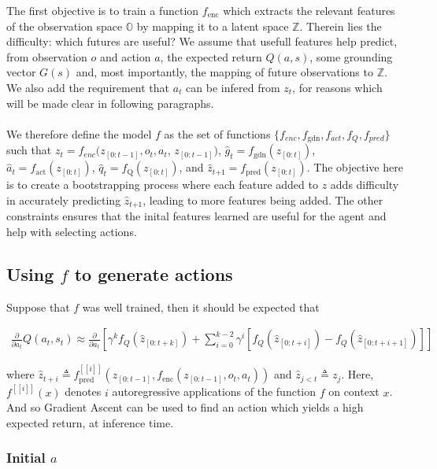 \documentclass[]{article}
\begin{document}
The first objective is to train a function $f_{\text{enc}}$ which extracts the relevant features of the observation space $\mathbb{O}$ by mapping it to a latent space $\mathbb{Z}$. Therein lies the difficulty: which futures are useful?
We assume that usefull features help predict, from observation $o$ and action $a$, the expected return $Q(a, s)$, some grounding vector $G(s)$ and, most importantly, the mapping of future observations to $\mathbb{Z}$. We also add the requirement that $a_t$ can be infered from $z_t$, for reasons which will be made clear in following paragraphs.
\\ \\ 
We therefore define the model $f$ as the set of functions $\{f_{enc}, f_{\text{gdn}}, f_{act}, f_{Q}, f_{pred}\}$ such that $z_t = f_{enc}(z_{[0:t-1]}, o_t, a_t$, $z_{[0:t-1]})$, $\hat{g}_t = f_{\text{gdn}}(z_{[0:t]})$, $\hat{a}_t = f_{\text{act}}(z_{[0:t]})$, $\hat{q}_t = f_{\text{Q}}(z_{[0:t]})$, and $\hat{z}_{t \boldsymbol{+}1} = f_{\text{pred}}(z_{[0:t]})$. The objective here is to create a bootstrapping process where each feature added to $z$ adds difficulty in accurately predicting $\hat{z}_{t \boldsymbol{+}1}$, leading to more features being added. The other constraints ensures that the inital features learned are useful for the agent and help with selecting actions.



\subsection{Using $f$ to generate actions}

Suppose that $f$ was well trained, then it should be expected that


\begin{align}
\frac{\partial}{\partial a_t}Q(a_t, s_t)
\approx
\frac{\partial}{\partial a_t} \left[ 
	\gamma^{k}f_{Q}(\hat{z}_{[0:t+k]}) + \sum_{i=0}^{k-2} \gamma^{i}\left[f_{Q}(\hat{z}_{[0:t+i]}) -f_{Q}(\hat{z}_{[0:t+i+1]})\right]
\right]
\end{align}


where 
$
\hat{z}_{t+i} \triangleq f^{[[i]] }_{\text{pred}}(z_{[0:t-1]}, f_{\text{enc}}(z_{[0:t-1]}, o_t, a_t)) 
$
and
$
\hat{z}_{j<t} \triangleq z_j
$. Here, $f^{[[i]]}(x)$ denotes $i$ autoregressive applications of the function $f$ on context $x$. And so Gradient Ascent can be used to find an action which yields a high expected return, at inference time.

\subsubsection{Initial $a$}
\end{document}
